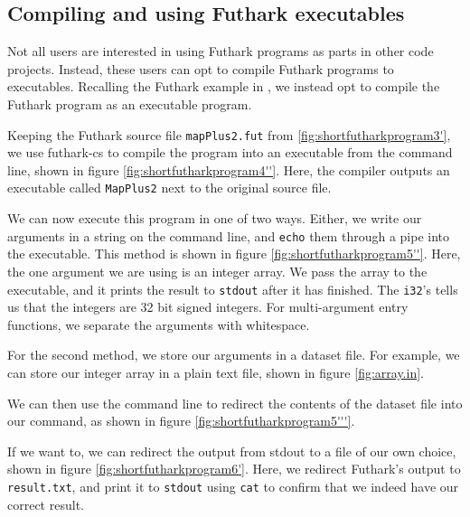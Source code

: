 \subsection{Compiling and using Futhark \csharp{} executables}
\label{subsec:futharkcsexe}
Not all users are interested in using Futhark programs as parts in other code
projects. Instead, these users can opt to compile Futhark programs to
executables. Recalling the Futhark example in
,
we instead opt to compile the Futhark program as an executable program.

Keeping the Futhark source file \texttt{mapPlus2.fut} from
\ref{fig:shortfutharkprogram3'}, we use futhark-cs to compile the program into
an executable from the command line, shown in figure \ref{fig:shortfutharkprogram4''}.
Here, the compiler outputs an executable called \texttt{MapPlus2} next to the
original source file.

We can now execute this program in one of two ways.
Either, we write our arguments in a string on the command line, and
\texttt{echo} them through a pipe into the executable. This method is shown in
figure \ref{fig:shortfutharkprogram5''}. Here, the one argument we are using is
an integer array. We pass the array to the executable, and it prints the result
to \texttt{stdout} after it has finished. The \texttt{i32}'s tells us that the
integers are 32 bit signed integers.
For multi-argument entry functions, we separate the arguments with whitespace.

For the second method, we store our arguments in a dataset file. For example, we
can store our integer array in a plain text file, shown in figure \ref{fig:array.in}.

We can then use the command line to redirect the contents of the dataset file
into our command, as shown in figure \ref{fig:shortfutharkprogram5'''}.

If we want to, we can redirect the output from stdout to a file of our own
choice, shown in figure \ref{fig:shortfutharkprogram6'}. Here, we redirect
Futhark's output to \texttt{result.txt}, and print it to \texttt{stdout} using
\texttt{cat} to confirm that we indeed have our correct result.


